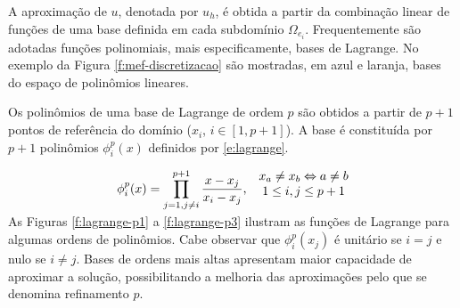 \documentclass[12pt]{report}
\begin{document}
A aproximação de $u$, denotada por $u_h$, é obtida a partir da combinação linear de funções de uma base definida em cada subdomínio $\Omega_{e_i}$. Frequentemente são adotadas funções polinomiais, mais especificamente, bases de Lagrange. No exemplo da Figura \ref{f:mef-discretizacao} são mostradas, em azul e laranja, bases do espaço de polinômios lineares. 

Os polinômios de uma base de Lagrange de ordem $p$ são obtidos a partir de $p+1$ pontos de referência do domínio ($x_i$, $i\in[1, p+1]$). A base é constituída por $p+1$ polinômios $\phi_i^p(x)$ definidos por \eqref{e:lagrange}.

\begin{equation}
	\begin{array}{rc}
	\multirow{2}{*}{$
		\displaystyle
		\phi_i^p(x) = \prod_{j=1, j \neq i}^{p+1} \frac{x-x_j}{x_i-x_j}
		$,} &
	x_a \neq x_b \Leftrightarrow  a \neq b \\ & 
	1 \leq i, j \leq p+1
	
	\end{array}
	\label{e:lagrange}
\end{equation}

As Figuras \ref{f:lagrange-p1} a \ref{f:lagrange-p3} ilustram as funções de Lagrange para algumas ordens de polinômios. Cabe observar que $\phi^p_i(x_j)$ é unitário se $i=j$ e nulo se $i \neq j$. Bases de ordens mais altas apresentam maior capacidade de aproximar a solução, possibilitando a melhoria das aproximações pelo que se denomina refinamento $p$. 
\end{document}
